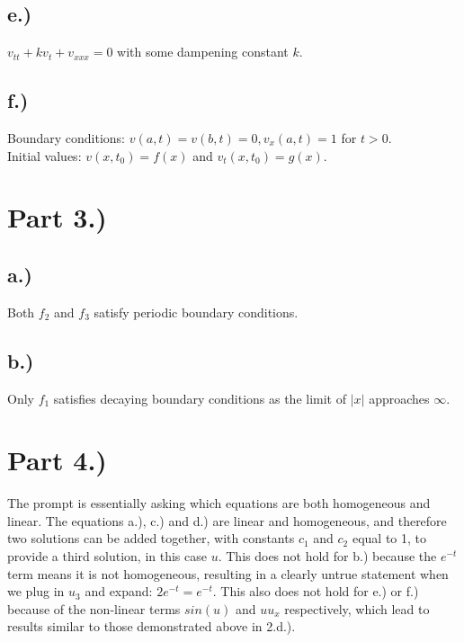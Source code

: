\documentclass{article}
\begin{document}
\subsection*{e.)}
$v_{tt} + kv_t + v_{xxx} = 0$ with some dampening constant $k$.
\subsection*{f.)}
Boundary conditions: $v(a, t) = v(b, t) = 0, v_x(a,t) = 1$ for $t > 0$.\\
Initial values: $v(x, t_0) = f(x)$ and $v_t(x, t_0) = g(x)$.
\section*{Part 3.)}
\subsection*{a.)}
Both $f_2$ and $f_3$ satisfy periodic boundary conditions. 
\subsection*{b.)}
Only $f_1$ satisfies decaying boundary conditions as the limit of $\lvert x\rvert$ approaches $\infty$.
\section*{Part 4.)}
The prompt is essentially asking which equations are both homogeneous and linear. The equations a.), c.) and d.) are linear and homogeneous, and therefore two solutions can be added together, with constants $c_1$ and $c_2$ equal to 1, to provide a third solution, in this case $u$. This does not hold for b.) because the $e^{-t}$ term means it is not homogeneous, resulting in a clearly untrue statement when we plug in $u_3$ and expand: $2e^{-t} = e^{-t}$. This also does not hold for e.) or f.) because of the non-linear terms $sin(u)$ and $uu_x$ respectively, which lead to results similar to those demonstrated above in 2.d.).
\end{document}
